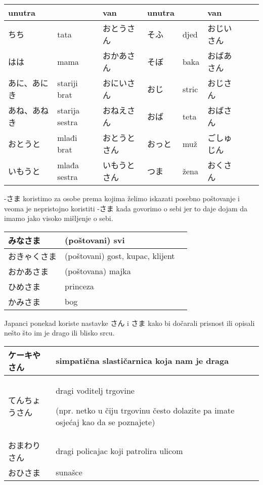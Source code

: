 	\vspace{10pt}	
	
	\begin{tabular}{|l|l|l||l|l|l|l|l|}
		\hline
		unutra& &van&unutra& &van\\\hline
		ちち&tata&おとうさん&そふ&djed&おじいさん\\\hline
		はは&mama&おかあさん&そぼ&baka&おばあさん\\\hline
		あに、あにき&stariji brat&おにいさん&おじ&stric&おじさん\\\hline
		あね、あねき&starija sestra&おねえさん&おば&teta&おばさん\\\hline
		おとうと&mlađi brat&おとうとさん&おっと&muž&ごしゅじん\\\hline
		いもうと&mlađa sestra&いもうとさん&つま&žena&おくさん\\\hline
	\end{tabular}
	
	
	\newpage
	
	-さま koristimo za osobe prema kojima želimo iskazati posebno poštovanje i veoma je nepristojno koristiti -さま kada govorimo o sebi jer to daje dojam da imamo jako visoko mišljenje o sebi.
	
	\vspace{10pt}
	
	\begin{tabular}{|l|l|l|}
		\hline
		みなさま&(poštovani) svi\\\hline
		おきゃくさま&(poštovani) gost, kupac, klijent\\\hline
		おかあさま&(poštovana) majka\\\hline
		ひめさま&princeza\\\hline
		かみさま&bog\\\hline
	\end{tabular}
	
	\vspace{10pt}
	
	
	Japanci ponekad koriste nastavke さん i さま kako bi dočarali prisnost ili opisali nešto što im je drago ili blisko srcu.
	
	\vspace{10pt}	
	

\begin{tabular}{|l|p{400pt}|}
		\hline
		ケーキやさん&simpatična slastičarnica koja nam je draga\\\hline
		てんちょうさん&dragi voditelj trgovine 
		
		(npr. netko u čiju trgovinu često dolazite pa imate osjećaj kao da se poznajete)\\\hline
		おまわりさん&dragi policajac koji patrolira ulicom\\\hline
		おひさま&sunašce\\\hline
	\end{tabular}

